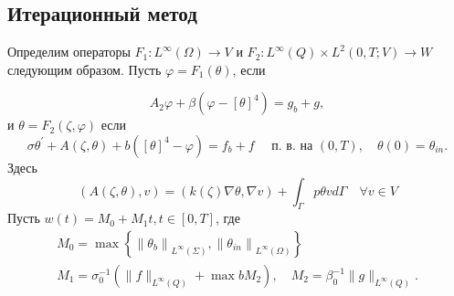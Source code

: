 \subsection{Итерационный метод}
\label{subsec:ch3/sec1/iterative}
Определим операторы
$F_{1}: L^{\infty}(\Omega) \rightarrow V$ и $F_{2}: L^{\infty}(Q) \times L^{2}(0, T ;V) \rightarrow W$
следующим образом.
Пусть $\varphi=F_{1}(\theta)$, если

\begin{equation}
    \label{eq:3_1:6}
    A_{2} \varphi+\beta\left(\varphi-[\theta]^{4}\right)=g_{b}+g,
\end{equation}
и $\theta=F_{2}(\zeta, \varphi)$ если
\begin{equation}
    \label{eq:3_1:7}
    \sigma \theta^{\prime}+A(\zeta, \theta)+b\left([\theta]^{4}-\varphi\right)=f_{b}
    +f \quad \text { п. в. на }(0, T), \quad \theta(0)=\theta_{i n}.
\end{equation}
Здесь
\[
    (A(\zeta, \theta), v)=(k(\zeta) \nabla \theta, \nabla v)
    +\int_{\Gamma} p \theta v d \Gamma \quad \forall v \in V
\]
Пусть $w(t)=M_{0}+M_{1} t, t \in[0, T]$, где
\[
    \begin{gathered}
        M_{0}=\max \left\{\left\|\theta_{b}\right\|_{L^{\infty}(\Sigma)},
        \left\|\theta_{i n}\right\|_{L^{\infty}(\Omega)}\right\} \\
        M_{1}=\sigma_{0}^{-1}\left(\|f\|_{L^{\infty}(Q)}+\max b M_{2}\right),
        \quad M_{2}=\beta_{0}^{-1}\|g\|_{L^{\infty}(Q)}.
    \end{gathered}
\]

